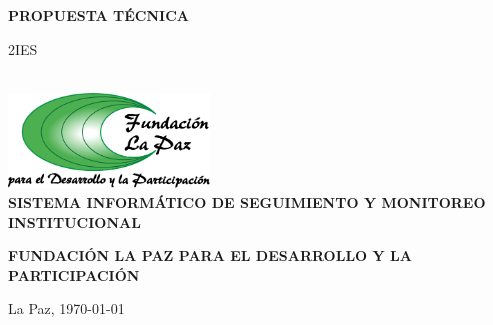 \begin{titlepage}
	\centering
	{\bfseries \large PROPUESTA TÉCNICA\par 2IES}\\[6cm]

	\includegraphics[width=0.4\textwidth]{assets/FUDEPLOGO.png}\\[1cm]

	\textbf{\LARGE \MakeUppercase{Sistema Informático de Seguimiento y Monitoreo Institucional}}

	\textbf{\MakeUppercase{Fundación La Paz para el Desarrollo y la Participación}}
	\vfill
	{La Paz, \today\par}
\end{titlepage}